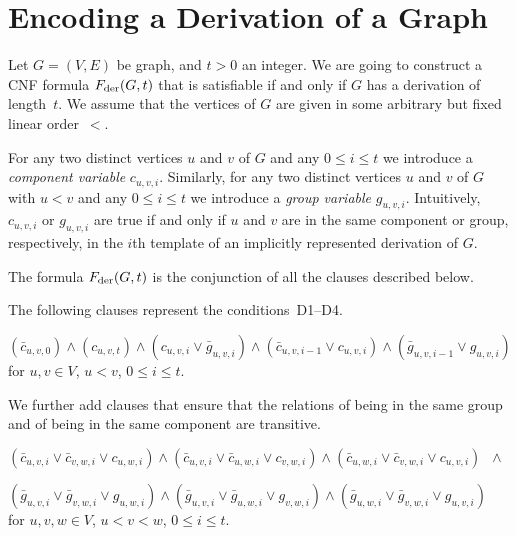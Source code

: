 \documentclass[10pt,usletter]{article}
\newenvironment{myquote}{\begin{center}
    \begin{minipage}{.80\linewidth}}{\end{minipage}\end{center}}
\theoremstyle{remark}
\newcommand{\Fder}{F_{\text{\normalfont der}}}
\begin{document}
\section{Encoding a Derivation of a Graph}
Let $G=(V,E)$ be graph, and $t>0$ an integer. We
are going to construct a CNF formula $\Fder(G,t)$ that is satisfiable if
and only if $G$ has a derivation of length~$t$.
We assume that the vertices of $G$ are given in some arbitrary but
fixed linear order~$<$.  

For any two distinct vertices $u$ and $v$ of $G$ and any $0\leq i \leq
t$ we introduce a {\em component variable} $c_{u,v,i}$.  Similarly, for any two
distinct vertices $u$ and $v$ of $G$ with $u<v$ and any $0\leq i \leq
t$ we introduce a {\em group variable} $g_{u,v,i}$. Intuitively, $c_{u,v,i}$ or
$g_{u,v,i}$ are true if and only if $u$ and $v$ are in the same component or group, respectively,
in the $i$th template of an implicitly represented derivation of $G$.


The formula $\Fder(G,t)$ is the conjunction of all the clauses described
below.

\noindent The following clauses represent the conditions~D1--D4.
\begin{myquote}
$(\bar c_{u,v,0}) \land (c_{u,v,t})
\land
(c_{u,v,i} \lor \bar g_{u,v,i}) 
\land
(\bar c_{u,v,i -1 } \lor c_{u,v,i})
\land
(\bar g_{u,v,i -1 } \lor g_{u,v,i})$ \\
 \phantom{x}\hfill for $u,v \in V$, $u<v$, $0\leq i \leq t$.
\end{myquote}

We further add clauses that ensure that the  relations of being in the
same group  and of being in the same component are transitive.
\begin{myquote}
  $(\bar c_{u,v,i} \lor \bar c_{v,w,i} \lor c_{u,w,i}) \land (\bar
  c_{u,v,i} \lor \bar c_{u,w,i} \lor c_{v,w,i}) \land (\bar c_{u,w,i}
  \lor \bar c_{v,w,i} \lor c_{u,v,i})\;\; \land $ 

$(\bar g_{u,v,i} \lor \bar g_{v,w,i} \lor g_{u,w,i}) \land (\bar g_{u,v,i} \lor \bar g_{u,w,i} \lor g_{v,w,i}) \land (\bar g_{u,w,i} \lor \bar g_{v,w,i} \lor g_{u,v,i})$ \\
\phantom{x}\hfill for $u,v,w\in V$, $u<v<w$, $0\leq i \leq t$.
\end{myquote}
\end{document}
